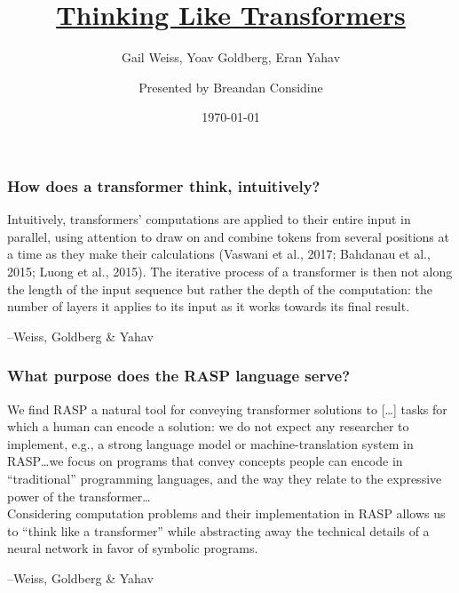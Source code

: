 \documentclass[mathserif,notheorems]{beamer}
\title{\href{https://arxiv.org/pdf/2106.06981.pdf}{Thinking Like Transformers}}
\subtitle{Gail Weiss, Yoav Goldberg, Eran Yahav}
\author{Presented by Breandan Considine}
\institute[McGill]{
  McGill University \\
  \medskip
  \textit{breandan.considine@mail.mcgill.ca}
}
\date{\today}
\theoremstyle{plain} %
\theoremstyle{definition} %
\begin{document}
  \begin{frame}
    \titlepage
  \end{frame}


  \begin{frame}
    \frametitle{How does a transformer think, intuitively?}
    \begin{tcolorbox}
    Intuitively, transformers’ computations are applied to their
    entire input in parallel, using attention to draw on and combine tokens from several positions at a time as they make
    their calculations (Vaswani et al., 2017; Bahdanau et al.,
    2015; Luong et al., 2015). The iterative process of a transformer is then not along the length of the input sequence but
    rather the depth of the computation: the number of layers it
    applies to its input as it works towards its final result.
      \begin{flushright}
        --Weiss, Goldberg \& Yahav
      \end{flushright}
    \end{tcolorbox}
  \end{frame}

  \begin{frame}
    \frametitle{What purpose does the RASP language serve?}

    \begin{tcolorbox}
      We find RASP a natural tool for conveying transformer
      solutions to [\ldots] tasks for which a human can encode a solution: we do not
      expect any researcher to implement, e.g., a strong language
      model or machine-translation system in RASP\ldots we
      focus on programs that convey concepts people can
      encode in ``traditional'' programming languages, and the
      way they relate to the expressive power of the transformer\ldots\\

      Considering computation problems and their implementation in RASP allows us to “think
      like a transformer” while abstracting away the technical
      details of a neural network in favor of symbolic programs.

      \begin{flushright}
        --Weiss, Goldberg \& Yahav
      \end{flushright}
    \end{tcolorbox}
  \end{frame}
\end{document}
